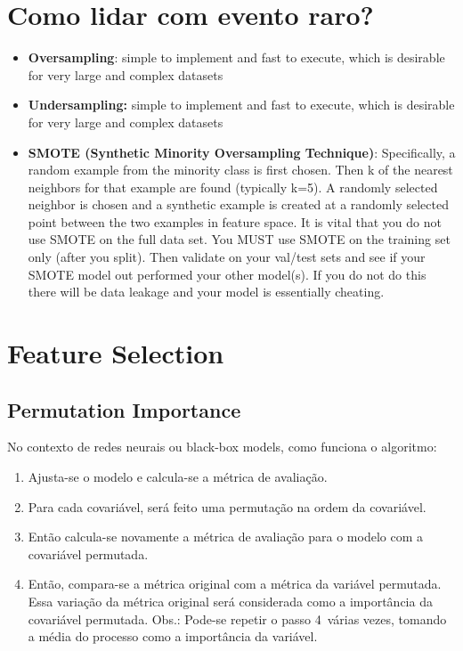 \section{Como lidar com evento raro?}
\begin{itemize}
    \item \textbf{Oversampling}: simple to implement and fast to execute, which is desirable for very large and complex datasets
    \item \textbf{Undersampling:} simple to implement and fast to execute, which is desirable for very large and complex datasets
    \item \textbf{SMOTE (Synthetic Minority Oversampling Technique)}: Specifically, a random example from the minority class is first chosen. Then k of the nearest neighbors for that example are found (typically k=5). A randomly selected neighbor is chosen and a synthetic example is created at a randomly selected point between the two examples in feature space. It is vital that you do not use SMOTE on the full data set. You MUST use SMOTE on the training set only (after you split). Then validate on your val/test sets and see if your SMOTE model out performed your other model(s). If you do not do this there will be data leakage and your model is essentially cheating.
\end{itemize}

\section{Feature Selection}
\subsection{Permutation Importance}
No contexto de redes neurais ou black-box models, como funciona o algoritmo:

\begin{enumerate}
\item Ajusta-se o modelo e calcula-se a métrica de avaliação.
\item Para cada covariável, será feito uma permutação na ordem da covariável.
\item Então calcula-se novamente a métrica de avaliação para o modelo com a covariável permutada.
\item Então, compara-se a métrica original com a métrica da variável permutada. Essa variação da métrica original será considerada como a importância da covariável permutada. Obs.: Pode-se repetir o passo 4 várias vezes, tomando a média do processo como a importância da variável.
\end{enumerate}

